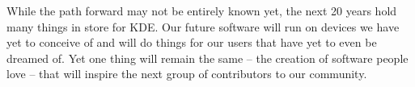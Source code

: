 While the path forward may not be entirely known yet, the next 20 years hold many things in store for KDE. Our future software will run on devices we have yet to conceive of and will do things for our users that have yet to even be dreamed of. Yet one thing will remain the same – the creation of software people love – that will inspire the next group of contributors to our community.
